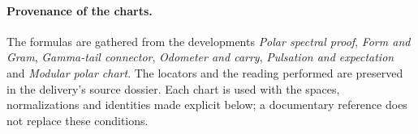 \paragraph{Provenance of the charts.}
The formulas are gathered from the developments \emph{Polar spectral proof},
\emph{Form and Gram}, \emph{Gamma-tail connector}, \emph{Odometer and
carry}, \emph{Pulsation and expectation} and \emph{Modular polar chart}.
The locators and the reading performed are preserved in the delivery's
source dossier. Each chart is used with the spaces,
normalizations and identities made explicit below; a
documentary reference does not replace these conditions.

